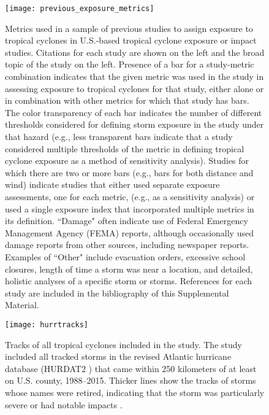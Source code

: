 \documentclass[11pt, titlepage]{article}
\begin{document}
\begin{figure}[tbhp!]
\centering
\texttt{[image: previous\_exposure\_metrics]}
\caption{Metrics used in a sample of previous studies to assign exposure to tropical cyclones in U.S.-based tropical cyclone exposure or impact studies. Citations for each study are shown on the left and the broad topic of the study on the left. Presence of a bar for a study-metric combination indicates that the given metric was used in the study in assessing exposure to tropical cyclones for that study, either alone or in combination with other metrics for which that study has bars. The color transparency of each bar indicates the number of different thresholds considered for defining storm exposure in the study under that hazard (e.g., less transparent bars indicate that a study considered multiple thresholds of the metric in defining tropical cyclone exposure as a method of sensitivity analysis). Studies for which there are two or more bars (e.g., bars for both distance and wind) indicate studies that either used separate exposure assessments, one for each metric, (e.g., as a sensitivity analysis) or used a single exposure index that incorporated multiple metrics in its definition. ``Damage" often indicate use of Federal Emergency Management Agency (FEMA) reports, although occasionally used damage reports from other sources, including newspaper reports. Examples of ``Other" include evacuation orders, excessive school closures, length of time a storm was near a location, and detailed, holistic analyses of a specific storm or storms. References for each study are included in the
bibliography of this Supplemental Material.}
\label{fig:previousmetrics}
\end{figure}

\nocite{logan2015, gares2014, esnard2011, zandbergen2009, horney2016, grabich2016, 
antipova2015post, zahran2010, currie2013, grabich2015, grabich2016hurricane, amstadter2010,
acierno2006, le2013, lieberman2017, mckinney2011, dosa2012evacuate, swerdel2014, 
czajkowski2011, mongin2017, kessler2007hurricane, caillouet2008increase, 
rosenheim2018disaster, domino2003disasters, kim2016, kinney2008, kim2015, tansel2010,
escobedo2009, fuller2014, baggerly2008impact, strobl2011economic, mukherjee2017}

\newpage

\begin{figure}[tbhp!]
\centering
\texttt{[image: hurrtracks]}
\caption{Tracks of all tropical cyclones included in the study. The study included all tracked storms in the revised Atlantic hurricane database (HURDAT2 \citep{landsea2013}) that came within 250 kilometers of at least on U.S. county, 1988--2015. Thicker lines show the tracks of storms whose names were retired, indicating that the storm was particularly severe or had notable impacts \citep{retirednames}.}
\label{fig:hurrtracks}
\end{figure}
\end{document}

